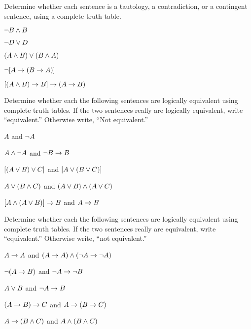 \begin{practiceproblems}
\problempart Determine whether each sentence is a tautology, a contradiction, or a contingent sentence, using a complete truth table.
\begin{earg}
\item $\neg B \mathbin{\wedge} B$ \vspace{.5ex} \hfill {}


\item $\neg D \vee D$ \vspace{.5ex} \hfill {}


\item $(A\mathbin{\wedge} B) \vee (B\mathbin{\wedge} A)$\vspace{.5ex} \hfill {}


\item $\neg[A \rightarrow (B \rightarrow A)]$\vspace{.5ex} \hfill {}




\item $[(A \mathbin{\wedge} B) \rightarrow B] \rightarrow (A \rightarrow B)$ \vspace{.5ex} \hfill {}


\end{earg}

\noindent\problempart
\label{pr.TT.equiv}
Determine whether each the following sentences are logically equivalent using complete truth tables. If the two sentences really are logically equivalent, write ``equivalent.'' Otherwise write, ``Not equivalent.''
\begin{earg}
\item $A$ and $\neg A$
\item $A \mathbin{\wedge} \neg A$ and $\neg B \rightarrow B$
\item $[(A \vee B) \vee C]$ and $[A \vee (B \vee C)]$
\item $A \vee (B \mathbin{\wedge} C)$ and $(A \vee B) \mathbin{\wedge} (A \vee C)$
\item $[A \mathbin{\wedge} (A \vee B)] \rightarrow B$ and $A \rightarrow B$\end{earg}


\problempart
\label{pr.TT.equiv2}
Determine whether each the following sentences are logically equivalent using complete truth tables. If the two sentences really are equivalent, write ``equivalent.'' Otherwise write, ``not equivalent.''
\begin{earg}
\item $A\rightarrow A$ and $(A \rightarrow A)\mathbin{\wedge} (\neg A\rightarrow\neg A)$
\item $\neg(A \rightarrow B)$ and $\neg A \rightarrow \neg B$
\item $A \vee B$ and $\neg A \rightarrow B$
\item$(A \rightarrow B) \rightarrow C$ and $A \rightarrow (B \rightarrow C)$
\item $A \rightarrow (B \mathbin{\wedge} C)$ and $A \mathbin{\wedge} (B \mathbin{\wedge} C)$
\end{earg}


\end{practiceproblems}
